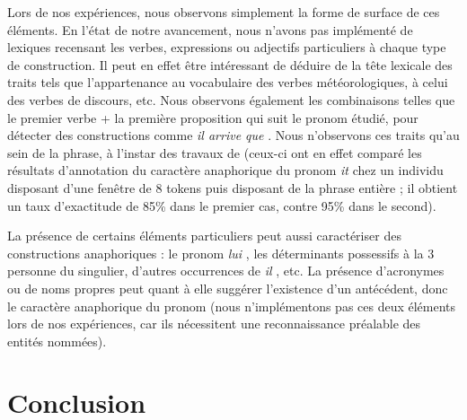 \documentclass[a4paper,12pt]{article}
\begin{document}
Lors de nos expériences, nous observons simplement la forme de surface de ces éléments. En l'état de notre avancement, nous n'avons pas implémenté de lexiques recensant les verbes, expressions ou adjectifs particuliers à chaque type de construction. Il peut en effet être intéressant de déduire de la tête lexicale des traits tels que l'appartenance au vocabulaire des verbes météorologiques, à celui des verbes de discours, etc.
Nous observons également les combinaisons telles que le premier verbe + la première proposition qui suit le pronom étudié, pour détecter des constructions comme \og \textit{il arrive que} \fg{}. Nous n'observons ces traits qu'au sein de la phrase, à l'instar des travaux de \citeauthor{Bergsma-11} (ceux-ci ont en effet comparé les résultats d'annotation du caractère anaphorique du pronom \og{}\textit{it}\fg{} chez un individu disposant d'une fenêtre de 8 tokens puis disposant de la phrase entière ; il obtient un taux d'exactitude de 85\% dans le premier cas, contre 95\% dans le second).

La présence de certains éléments particuliers peut aussi caractériser des constructions anaphoriques : le pronom \og \textit{lui} \fg{}, les déterminants possessifs à la 3 personne du singulier, d'autres occurrences de \og \textit{il} \fg{}, etc. La présence d'acronymes ou de noms propres peut quant à elle suggérer l'existence d'un antécédent, donc le caractère anaphorique du pronom (nous n'implémentons pas ces deux éléments lors de nos expériences, car ils nécessitent une reconnaissance préalable des entités nommées).



\section*{Conclusion}





\end{document}
